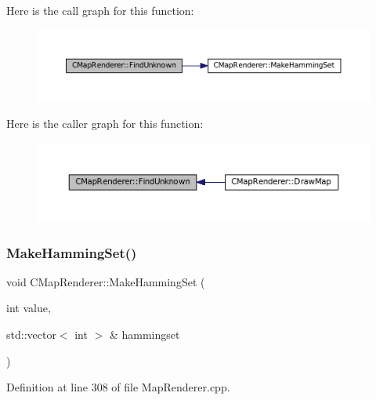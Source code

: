 Here is the call graph for this function\+:\nopagebreak
\begin{figure}[H]
\begin{center}
\leavevmode
\includegraphics[width=350pt]{classCMapRenderer_aec3c1d3294ac3af8ebb717ed5be88870_cgraph}
\end{center}
\end{figure}
Here is the caller graph for this function\+:\nopagebreak
\begin{figure}[H]
\begin{center}
\leavevmode
\includegraphics[width=350pt]{classCMapRenderer_aec3c1d3294ac3af8ebb717ed5be88870_icgraph}
\end{center}
\end{figure}
\hypertarget{classCMapRenderer_a0b06ba89b9a7ad75fa945a3c22dc019a}{}\label{classCMapRenderer_a0b06ba89b9a7ad75fa945a3c22dc019a} 
\subsubsection{\texorpdfstring{Make\+Hamming\+Set()}{MakeHammingSet()}}
{\footnotesize\ttfamily void C\+Map\+Renderer\+::\+Make\+Hamming\+Set (\begin{DoxyParamCaption}\item[{int}]{value,  }\item[{std\+::vector$<$ int $>$ \&}]{hammingset }\end{DoxyParamCaption})\hspace{0.3cm}{\ttfamily [protected]}}



Definition at line 308 of file Map\+Renderer.\+cpp.


